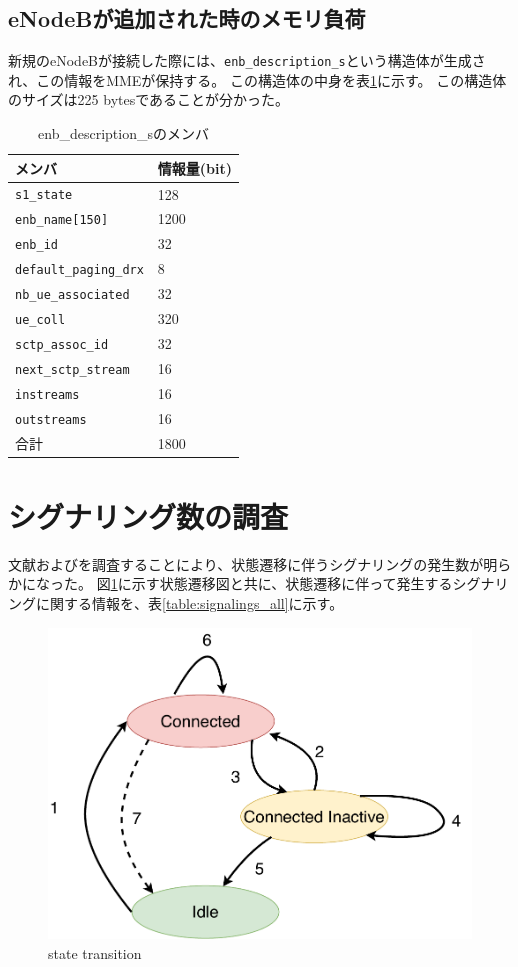 \documentclass[a4j]{ujarticle}
\begin{document}
\clearpage


\subsection{eNodeBが追加された時のメモリ負荷}
新規のeNodeBが接続した際には、\verb|enb_description_s|という構造体が生成され、この情報をMMEが保持する。
この構造体の中身を表\ref{table:oai_source_enb_description_s}に示す。
この構造体のサイズは225 bytesであることが分かった。
\begin{table}[htbp]
  \centering
  \caption{enb\_description\_sのメンバ}
  \label{table:oai_source_enb_description_s}
  \begin{tabular}{l|l}
    \hline
    メンバ & 情報量(bit) \\ \hline \hline
    \verb|s1_state| & 128\\
    \verb|enb_name[150]| & 1200\\
    \verb|enb_id| & 32\\
    \verb|default_paging_drx| & 8\\
    \verb|nb_ue_associated| & 32\\ %
    \verb|ue_coll| & 320\\
    \verb|sctp_assoc_id| & 32\\
    \verb|next_sctp_stream| & 16\\
    \verb|instreams| & 16\\
    \verb|outstreams| & 16\\ \hline %
    合計  & 1800\\\hline
  \end{tabular}
\end{table}

\section{シグナリング数の調査}
\label{seq:mme_signaling}
文献\cite{3gpp.23.720}および\cite{ANovelStateModelfor5GRadioAccessNetworks}を調査することにより、状態遷移に伴うシグナリングの発生数が明らかになった。
図\ref{state_id}に示す状態遷移図と共に、状態遷移に伴って発生するシグナリングに関する情報を、表\ref{table:signalings_all}に示す。

\begin{figure}[htbp]
  \centering
  \includegraphics[width=0.9\hsize]{state_id.pdf}
  \caption{state transition}
  \label{state_id}
\end{figure}
\end{document}
